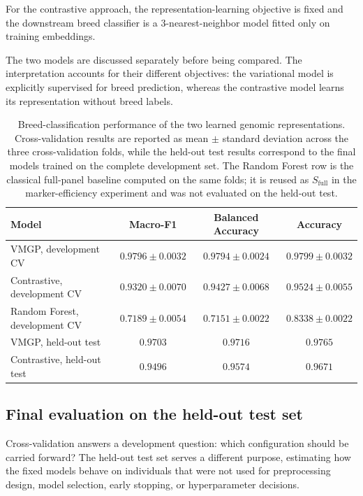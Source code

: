 For the contrastive approach, the representation-learning objective is
fixed and the downstream breed classifier is a $3$-nearest-neighbor
model fitted only on training embeddings.

The two models are discussed separately before being compared. The
interpretation accounts for their different objectives: the
variational model is explicitly supervised for breed prediction,
whereas the contrastive model learns its representation without breed
labels.

\begin{table}[ht]
\centering
\caption{Breed-classification performance of the two learned genomic
representations. Cross-validation results are reported as mean
$\pm$ standard deviation across the three cross-validation folds, while
the held-out test results correspond to the final models trained on the
complete development set. The Random Forest row is the classical
full-panel baseline computed on the same folds; it is reused as
$S_{\mathrm{full}}$ in the marker-efficiency experiment and was not
evaluated on the held-out test.}
\label{tab:rq1_final_comparison}
\begin{tabular}{lccc}
\hline
Model & Macro-F1 & Balanced Accuracy & Accuracy \\
\hline
VMGP, development CV
& $0.9796 \pm 0.0032$
& $0.9794 \pm 0.0024$
& $0.9799 \pm 0.0032$ \\

Contrastive, development CV
& $0.9320 \pm 0.0070$
& $0.9427 \pm 0.0068$
& $0.9524 \pm 0.0055$ \\

Random Forest, development CV
& $0.7189 \pm 0.0054$
& $0.7151 \pm 0.0022$
& $0.8338 \pm 0.0022$ \\

VMGP, held-out test
& $\mathbf{0.9703}$
& $\mathbf{0.9716}$
& $\mathbf{0.9765}$ \\

Contrastive, held-out test
& $0.9496$
& $0.9574$
& $0.9671$ \\
\hline
\end{tabular}
\end{table}

\subsection{Final evaluation on the held-out test set}
\label{sec:locked_test_evaluation}

Cross-validation answers a development question: which configuration
should be carried forward? The held-out test set serves a different
purpose, estimating how the fixed models behave on individuals that were not used for
preprocessing design, model selection, early stopping, or
hyperparameter decisions.


